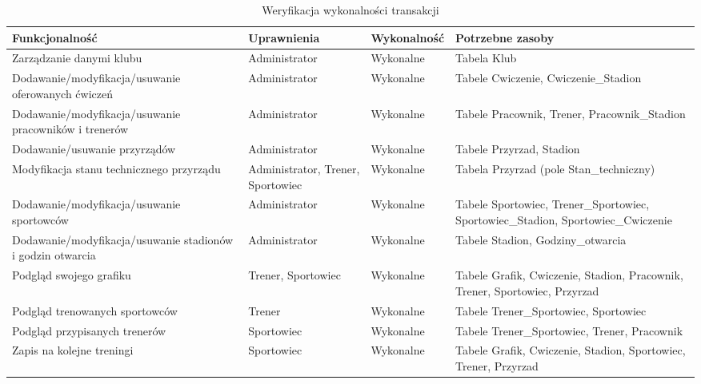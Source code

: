 \documentclass[11pt,a4paper]{article}
\begin{document}
\begin{table}[H]
\centering
\small
\begin{tabularx}{\textwidth}{|L{4.6cm}|L{2.5cm}|C{2.1cm}|X|}
\hline
\textbf{Funkcjonalność} & \textbf{Uprawnienia} & \textbf{Wykonalność} & \textbf{Potrzebne zasoby} \\
\hline
Zarządzanie danymi klubu & Administrator & Wykonalne & Tabela Klub \\
\hline
Dodawanie/modyfikacja/usuwanie oferowanych ćwiczeń & Administrator & Wykonalne & Tabele Cwiczenie, Cwiczenie\_Stadion \\
\hline
Dodawanie/modyfikacja/usuwanie pracowników i trenerów & Administrator & Wykonalne & Tabele Pracownik, Trener, Pracownik\_Stadion \\
\hline
Dodawanie/usuwanie przyrządów & Administrator & Wykonalne & Tabele Przyrzad, Stadion \\
\hline
Modyfikacja stanu technicznego przyrządu & Administrator, Trener, Sportowiec & Wykonalne & Tabela Przyrzad (pole Stan\_techniczny) \\
\hline
Dodawanie/modyfikacja/usuwanie sportowców & Administrator & Wykonalne & Tabele Sportowiec, Trener\_Sportowiec, Sportowiec\_Stadion, Sportowiec\_Cwiczenie \\
\hline
Dodawanie/modyfikacja/usuwanie stadionów i godzin otwarcia & Administrator & Wykonalne & Tabele Stadion, Godziny\_otwarcia \\
\hline
Podgląd swojego grafiku & Trener, Sportowiec & Wykonalne & Tabele Grafik, Cwiczenie, Stadion, Pracownik, Trener, Sportowiec, Przyrzad \\
\hline
Podgląd trenowanych sportowców & Trener & Wykonalne & Tabele Trener\_Sportowiec, Sportowiec \\
\hline
Podgląd przypisanych trenerów & Sportowiec & Wykonalne & Tabele Trener\_Sportowiec, Trener, Pracownik \\
\hline
Zapis na kolejne treningi & Sportowiec & Wykonalne & Tabele Grafik, Cwiczenie, Stadion, Sportowiec, Trener, Przyrzad \\
\hline
\end{tabularx}
\caption{Weryfikacja wykonalności transakcji}
\label{tab:transakcje}
\end{table}
\end{document}
